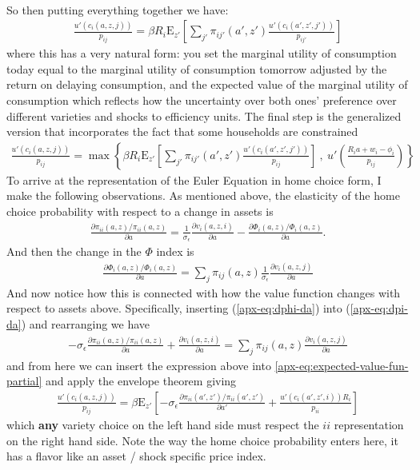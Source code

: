 \documentclass[12pt,pdftex]{article}
\begin{document}
\begin{onehalfspacing}
\begin{align}
\end{align}
So then putting everything together we have:
\begin{align}
\frac{u'(c_{i}(a, z, j))}{p_{ij}} = \beta R_{i} \mathrm{E}_{z'} \left[ \sum_{j'} \pi_{ij'}(a', z') \frac{u'(c_{i}(a', z',j'))}{p_{ij'}} \right]
\label{apx-eq:euler}
\end{align}
where this has a very natural form: you set the marginal utility of consumption today equal to the marginal utility of consumption tomorrow adjusted by the return on delaying consumption, and the expected value of the marginal utility of consumption which reflects how the uncertainty over both ones' preference over different varieties and shocks to efficiency units. The final step is the generalized version that incorporates the fact that some households are constrained
\begin{align}
\frac{u'(c_{i}(a, z, j))}{p_{ij}} = \max \left\{ \beta R_{i} \mathrm{E}_{z'} \left[ \sum_{j'} \pi_{ij'}(a', z') \frac{u'(c_{i}(a', z', j'))}{p_{ij}} \right] \ , \  u' \left( \frac{R_i a + w_i - \phi_{i}}{p_{ij}} \right) \right \}
\label{eq:apx-euler-equation}
\end{align}
To arrive at the representation of the Euler Equation in home choice form, I make the following observations. As mentioned above, the elasticity of the home choice probability with respect to a change in assets is
\begin{align}
\frac{\partial \pi_{ii}(a,z) / \pi_{ii}(a,z) }{\partial a} = \frac{1}{\sigma_{\epsilon}}\frac{\partial v_{i}(a,z,i)}{\partial a} - \frac{\partial \Phi_{i}(a,z) / \Phi_{i}(a,z)}{\partial a}.
\label{apx-eq:dpi-da}
\end{align}
And then the change in the $\Phi$ index is
\begin{align}
\frac{\partial \Phi_{i}(a,z) / \Phi_{i}(a,z)}{\partial a} = \sum_{j} \pi_{ij}(a,z) \frac{1}{\sigma_{\epsilon}}\frac{\partial v_{i}(a,z,j)}{\partial a}
\label{apx-eq:dphi-da}
\end{align}
And now notice how this is connected with how the value function changes with respect to assets above. Specifically, inserting (\ref{apx-eq:dphi-da}) into (\ref{apx-eq:dpi-da}) and rearranging we have
\begin{align}
-\sigma_{\epsilon} \frac{\partial \pi_{ii}(a,z) / \pi_{ii}(a,z) }{\partial a} + \frac{\partial v_{i}(a,z,i)}{\partial a} = 
\sum_{j} \pi_{ij}(a,z) \frac{\partial v_{i}(a,z,j)}{\partial a}
\end{align}
and from here we can insert the expression above into \ref{apx-eq:expected-value-fun-partial} and apply the envelope theorem giving
\begin{align}
\frac{u'(c_{i}(a, z, j))}{p_{ij}} = \beta \mathrm{E}_{z'} \left[ -\sigma_{\epsilon} \frac{\partial \pi_{ii}(a',z') / \pi_{ii}(a',z')}{\partial a'} + \frac{u'(c_{i}(a', z', i))R_i}{p_{ii}} \right]
\label{apx-eq:homechoice-euler}
\end{align}
which \textbf{any} variety choice on the left hand side must respect the $ii$ representation on the right hand side. Note the way the home choice probability enters here, it has a flavor like an asset / shock specific price index. 


\end{onehalfspacing}
\end{document}
